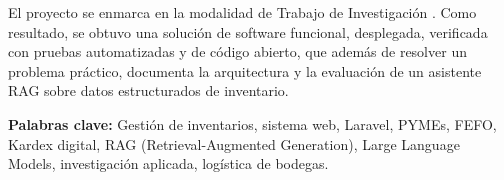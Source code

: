 El proyecto se enmarca en la modalidad de Trabajo de Investigación \cite{univalle_resolucion137}. Como resultado, se obtuvo una solución de software funcional, desplegada, verificada con pruebas automatizadas y de código abierto, que además de resolver un problema práctico, documenta la arquitectura y la evaluación de un asistente RAG sobre datos estructurados de inventario.

\textbf{Palabras clave:} Gestión de inventarios, sistema web, Laravel, PYMEs, FEFO, Kardex digital, RAG (Retrieval-Augmented Generation), Large Language Models, investigación aplicada, logística de bodegas.

